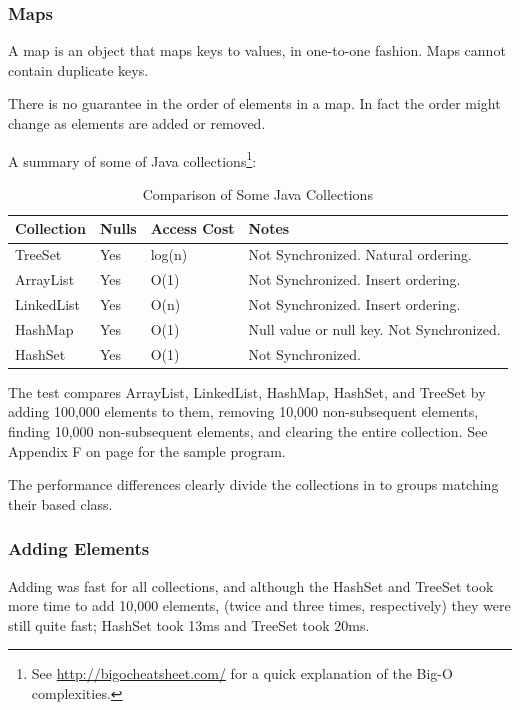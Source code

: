 \subsubsection{Maps}
A map is an object that maps keys to values, in one-to-one fashion. Maps cannot contain duplicate keys. \cite{map}

There is no guarantee in the order of elements in a map. In fact the order might change as elements are added or removed.  \cite{map}

A summary of some of Java collections\footnote{See \url{http://bigocheatsheet.com/} for a quick explanation of the Big-O complexities.}:
\begin{table}[H]
\centering
\begin{tabulary}{\columnwidth}{ |>{\raggedright\arraybackslash} p{0.18\columnwidth} | >{\raggedright\arraybackslash}p{0.08\columnwidth} | >{\raggedright\arraybackslash}p{0.1\columnwidth} | >{\raggedright\arraybackslash}p{0.4\columnwidth}|}
\hline
\textbf{Collection} & \textbf{Nulls} & \textbf{Access Cost}& \textbf{Notes} \\ \hline 
TreeSet  & Yes  & log(n) & Not Synchronized. Natural ordering. \\ \hline 
ArrayList  & Yes &   O(1) & Not Synchronized. Insert ordering.\\ \hline 
LinkedList  & Yes &  O(n) & Not Synchronized. Insert ordering.\\ \hline 
HashMap  & Yes & O(1) & Null value or null key. Not Synchronized. \\ \hline 
HashSet  & Yes & O(1) & Not Synchronized.  \\ \hline 
\end{tabulary}
\caption{Comparison of Some Java Collections}\label{tab:collections}
\end{table}

The test compares ArrayList, LinkedList, HashMap, HashSet, and TreeSet by adding 100,000 elements to them, removing 10,000 non-subsequent elements, finding 10,000 non-subsequent elements, and clearing the entire collection. See Appendix F on page \pageref{App:AppendixF} for the sample program.

The performance differences clearly divide the collections in to groups matching their based class.

\subsubsection{Adding Elements}
Adding was fast for all collections, and although the HashSet and TreeSet took more time to add 10,000 elements, (twice and three times, respectively) they were still quite fast; HashSet took 13ms and TreeSet took 20ms.

